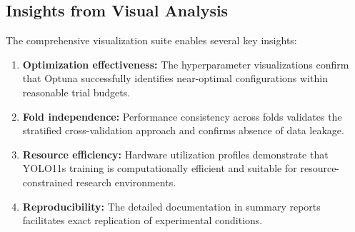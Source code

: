 \subsection{Insights from Visual Analysis}

The comprehensive visualization suite enables several key insights:

\begin{enumerate}
    \item \textbf{Optimization effectiveness:} The hyperparameter visualizations confirm that Optuna successfully identifies near-optimal configurations within reasonable trial budgets.
    
    \item \textbf{Fold independence:} Performance consistency across folds validates the stratified cross-validation approach and confirms absence of data leakage.
    
    \item \textbf{Resource efficiency:} Hardware utilization profiles demonstrate that YOLO11s training is computationally efficient and suitable for resource-constrained research environments.
    
    \item \textbf{Reproducibility:} The detailed documentation in summary reports facilitates exact replication of experimental conditions.
\end{enumerate}
